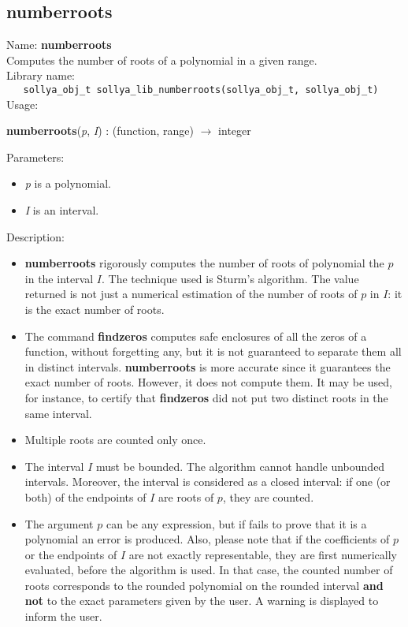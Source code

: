 \subsection{numberroots}
\label{labnumberroots}
\noindent Name: \textbf{numberroots}\\
\phantom{aaa}Computes the number of roots of a polynomial in a given range.\\[0.2cm]
\noindent Library name:\\
\verb|   sollya_obj_t sollya_lib_numberroots(sollya_obj_t, sollya_obj_t)|\\[0.2cm]
\noindent Usage: 
\begin{center}
\textbf{numberroots}(\emph{p}, \emph{I}) : (\textsf{function}, \textsf{range}) $\rightarrow$ \textsf{integer}\\
\end{center}
Parameters: 
\begin{itemize}
\item \emph{p} is a polynomial.
\item \emph{I} is an interval.
\end{itemize}
\noindent Description: \begin{itemize}

\item \textbf{numberroots} rigorously computes the number of roots of polynomial the $p$ in
   the interval $I$. The technique used is Sturm's algorithm. The value returned
   is not just a numerical estimation of the number of roots of $p$ in $I$: it is
   the exact number of roots.

\item The command \textbf{findzeros} computes safe enclosures of all the zeros of a
   function, without forgetting any, but it is not guaranteed to separate them
   all in distinct intervals. \textbf{numberroots} is more accurate since it guarantees 
   the exact number of roots. However, it does not compute them. It may be used,
   for instance, to certify that \textbf{findzeros} did not put two distinct roots in 
   the same interval.

\item Multiple roots are counted only once.

\item The interval $I$ must be bounded. The algorithm cannot handle unbounded
   intervals. Moreover, the interval is considered as a closed interval: if one
   (or both) of the endpoints of $I$ are roots of $p$, they are counted.

\item The argument $p$ can be any expression, but if \sollya fails to prove that
   it is a polynomial an error is produced. Also, please note that if the
   coefficients of $p$ or the endpoints of $I$ are not exactly representable,
   they are first numerically evaluated, before the algorithm is used. In that
   case, the counted number of roots corresponds to the rounded polynomial on
   the rounded interval \textbf{and not} to the exact parameters given by the user.
   A warning is displayed to inform the user.
\end{itemize}

